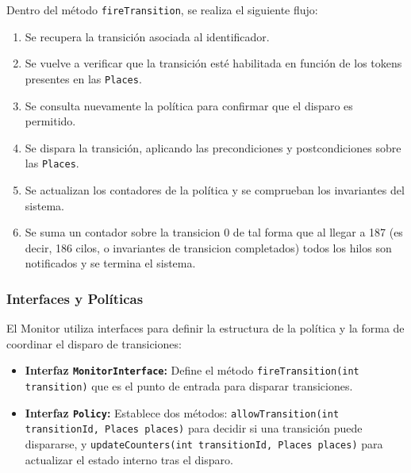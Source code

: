 \documentclass[12pt]{article}
\begin{document}
Dentro del método \texttt{fireTransition}, se realiza el siguiente flujo:
\begin{enumerate}
    \item Se recupera la transición asociada al identificador.
    \item Se vuelve a verificar que la transición esté habilitada en función de los tokens presentes en las \texttt{Places}.
    \item Se consulta nuevamente la política para confirmar que el disparo es permitido.
    \item Se dispara la transición, aplicando las precondiciones y postcondiciones sobre las \texttt{Places}.
    \item Se actualizan los contadores de la política y se comprueban los invariantes del sistema.
    \item Se suma un contador sobre la transicion 0 de tal forma que al llegar a 187 (es decir, 186 cilos, o invariantes de transicion completados) todos los hilos son notificados y se termina el sistema.
\end{enumerate}

\subsubsection{Interfaces y Políticas}

El Monitor utiliza interfaces para definir la estructura de la política y la forma de coordinar el disparo de transiciones:
\begin{itemize}
    \item \textbf{Interfaz \texttt{MonitorInterface}:} Define el método \texttt{fireTransition(int transition)} que es el punto de entrada para disparar transiciones.
    \item \textbf{Interfaz \texttt{Policy}:} Establece dos métodos: \texttt{allowTransition(int transitionId, Places places)} para decidir si una transición puede dispararse, y \texttt{updateCounters(int transitionId, Places places)} para actualizar el estado interno tras el disparo.
\end{itemize}
\end{document}
